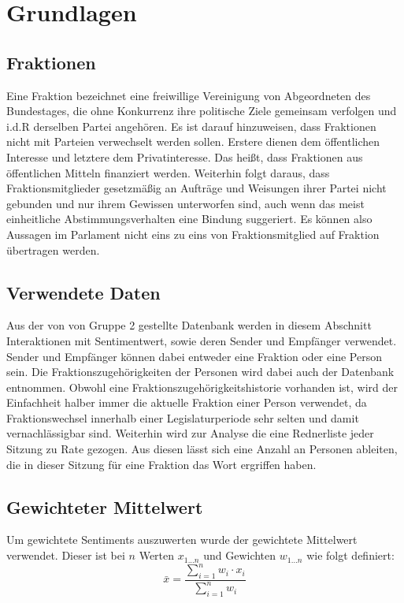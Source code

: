 \section{Grundlagen}\label{sec:06_02_grundlagen}
\subsection{Fraktionen}
Eine Fraktion bezeichnet eine freiwillige Vereinigung von Abgeordneten des Bundestages, die ohne Konkurrenz ihre politische Ziele gemeinsam verfolgen und i.d.R derselben Partei angehören. Es ist darauf hinzuweisen, dass Fraktionen nicht mit Parteien verwechselt werden sollen. Erstere dienen dem öffentlichen Interesse und letztere dem Privatinteresse. Das heißt, dass Fraktionen aus öffentlichen Mitteln finanziert werden. Weiterhin folgt daraus, dass Fraktionsmitglieder gesetzmäßig an Aufträge und Weisungen ihrer Partei nicht gebunden und nur ihrem Gewissen unterworfen sind, auch wenn das meist einheitliche Abstimmungsverhalten eine Bindung suggeriert. \cite{abgeordneterbpp} Es können also Aussagen im Parlament nicht eins zu eins von Fraktionsmitglied auf Fraktion übertragen werden.
\subsection{Verwendete Daten}
Aus der von von Gruppe 2 gestellte Datenbank werden in diesem Abschnitt Interaktionen mit Sentimentwert, sowie deren Sender und Empfänger verwendet. Sender und Empfänger können dabei entweder eine Fraktion oder eine Person sein. Die Fraktionszugehörigkeiten der Personen wird dabei auch der Datenbank entnommen. Obwohl eine Fraktionszugehörigkeitshistorie vorhanden ist, wird der Einfachheit halber immer die aktuelle Fraktion einer Person verwendet, da Fraktionswechsel innerhalb einer Legislaturperiode sehr selten und damit vernachlässigbar sind. Weiterhin wird zur Analyse die eine Rednerliste jeder Sitzung zu Rate gezogen. Aus diesen lässt sich eine Anzahl an Personen ableiten, die in dieser Sitzung für eine Fraktion das Wort ergriffen haben.

\subsection{Gewichteter Mittelwert}
Um gewichtete Sentiments auszuwerten wurde der gewichtete Mittelwert verwendet. Dieser ist bei $n$ Werten $x_{1...n}$ und Gewichten $w_{1...n}$ wie folgt definiert:
$$\bar{x}=\frac{\sum_{i=1}^{n} w_{i} \cdot x_{i}}{\sum_{i=1}^{n} w_{i}}$$
